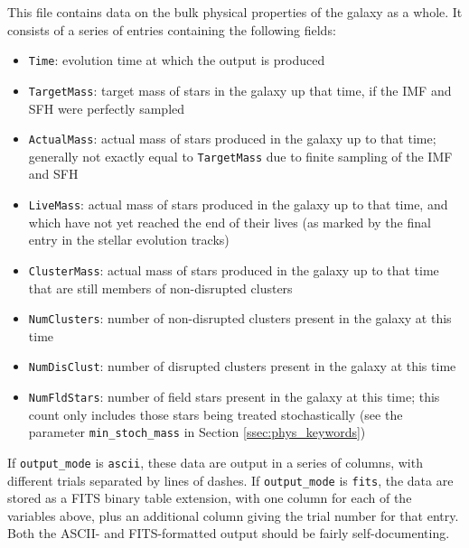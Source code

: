 \documentclass[12pt]{article}
\begin{document}
This file contains data on the bulk physical properties of the galaxy as a whole. It consists of a series of entries containing the following fields:
\begin{itemize}
\item \verb=Time=: evolution time at which the output is produced
\item \verb=TargetMass=: target mass of stars in the galaxy up that time, if the IMF and SFH were perfectly sampled
\item \verb=ActualMass=: actual mass of stars produced in the galaxy up to that time; generally not exactly equal to \verb=TargetMass= due to finite sampling of the IMF and SFH
\item \verb=LiveMass=: actual mass of stars produced in the galaxy up to that time, and which have not yet reached the end of their lives (as marked by the final entry in the stellar evolution tracks)
\item \verb=ClusterMass=: actual mass of stars produced in the galaxy up to that time that are still members of non-disrupted clusters
\item \verb=NumClusters=: number of non-disrupted clusters present in the galaxy at this time
\item \verb=NumDisClust=: number of disrupted clusters present in the galaxy at this time
\item \verb=NumFldStars=: number of field stars present in the galaxy at this time; this count only includes those stars being treated stochastically (see the parameter \verb=min_stoch_mass= in Section \ref{ssec:phys_keywords})
\end{itemize}

If \verb=output_mode= is \verb=ascii=, these data are output in a series of columns, with different trials separated by lines of dashes. If \verb=output_mode= is \verb=fits=, the data are stored as a FITS binary table extension, with one column for each of the variables above, plus an additional column giving the trial number for that entry. Both the ASCII- and FITS-formatted output should be fairly self-documenting.
\end{document}
